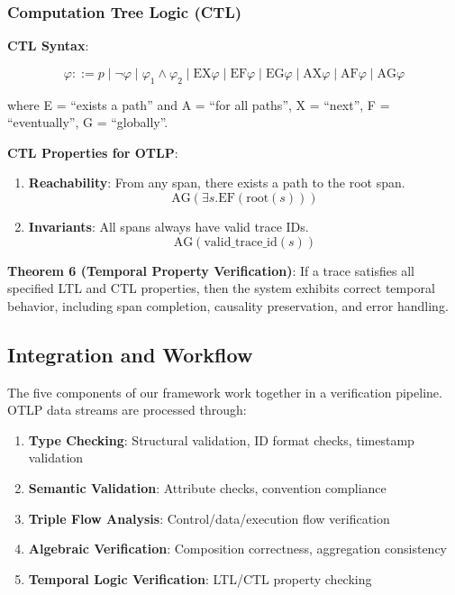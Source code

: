 \subsubsection{Computation Tree Logic (CTL)}

\textbf{CTL Syntax}:

\[
\varphi ::= p \mid \neg\varphi \mid \varphi_1 \land \varphi_2 \mid \text{EX}\varphi \mid \text{EF}\varphi \mid \text{EG}\varphi \mid \text{AX}\varphi \mid \text{AF}\varphi \mid \text{AG}\varphi
\]

where E = ``exists a path'' and A = ``for all paths'', X = ``next'', F = ``eventually'', G = ``globally''.

\textbf{CTL Properties for OTLP}:

\begin{enumerate}
\item \textbf{Reachability}: From any span, there exists a path to the root span.
\[
\text{AG}(\exists s. \text{EF}(\text{root}(s)))
\]

\item \textbf{Invariants}: All spans always have valid trace IDs.
\[
\text{AG}(\text{valid\_trace\_id}(s))
\]
\end{enumerate}

\textbf{Theorem 6 (Temporal Property Verification)}:
If a trace satisfies all specified LTL and CTL properties, then the system exhibits correct temporal behavior, including span completion, causality preservation, and error handling.

\subsection{Integration and Workflow}
\label{sec:integration}

The five components of our framework work together in a verification pipeline. OTLP data streams are processed through:

\begin{enumerate}
\item \textbf{Type Checking}: Structural validation, ID format checks, timestamp validation
\item \textbf{Semantic Validation}: Attribute checks, convention compliance
\item \textbf{Triple Flow Analysis}: Control/data/execution flow verification
\item \textbf{Algebraic Verification}: Composition correctness, aggregation consistency
\item \textbf{Temporal Logic Verification}: LTL/CTL property checking
\end{enumerate}

